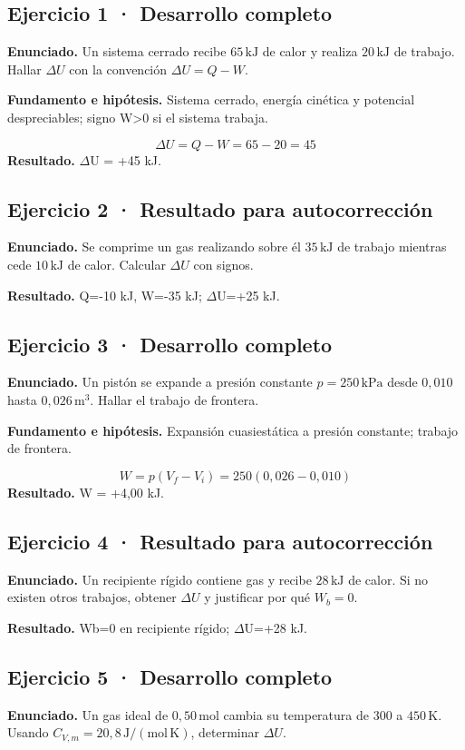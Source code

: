 \documentclass[11pt,a4paper]{article}
\begin{document}
\subsection*{Ejercicio 1 · Desarrollo completo}
\textbf{Enunciado.} Un sistema cerrado recibe \(65\,\mathrm{kJ}\) de calor y realiza \(20\,\mathrm{kJ}\) de trabajo. Hallar \(\Delta U\) con la convención \(\Delta U=Q-W\).

\textbf{Fundamento e hipótesis.} Sistema cerrado, energía cinética y potencial despreciables; signo W>0 si el sistema trabaja.

\[
\Delta U=Q-W=65-20=45
\]
\textbf{Resultado.} \ensuremath{\Delta}U = +45 kJ.


\subsection*{Ejercicio 2 · Resultado para autocorrección}
\textbf{Enunciado.} Se comprime un gas realizando sobre él \(35\,\mathrm{kJ}\) de trabajo mientras cede \(10\,\mathrm{kJ}\) de calor. Calcular \(\Delta U\) con signos.

\textbf{Resultado.} Q=-10 kJ, W=-35 kJ; \ensuremath{\Delta}U=+25 kJ.


\subsection*{Ejercicio 3 · Desarrollo completo}
\textbf{Enunciado.} Un pistón se expande a presión constante \(p=250\,\mathrm{kPa}\) desde \(0{,}010\) hasta \(0{,}026\,\mathrm{m^3}\). Hallar el trabajo de frontera.

\textbf{Fundamento e hipótesis.} Expansión cuasiestática a presión constante; trabajo de frontera.

\[
W=p(V_f-V_i)=250(0{,}026-0{,}010)
\]
\textbf{Resultado.} W = +4,00 kJ.


\subsection*{Ejercicio 4 · Resultado para autocorrección}
\textbf{Enunciado.} Un recipiente rígido contiene gas y recibe \(28\,\mathrm{kJ}\) de calor. Si no existen otros trabajos, obtener \(\Delta U\) y justificar por qué \(W_b=0\).

\textbf{Resultado.} Wb=0 en recipiente rígido; \ensuremath{\Delta}U=+28 kJ.


\subsection*{Ejercicio 5 · Desarrollo completo}
\textbf{Enunciado.} Un gas ideal de \(0{,}50\,\mathrm{mol}\) cambia su temperatura de \(300\) a \(450\,\mathrm K\). Usando \(C_{V,m}=20{,}8\,\mathrm{J/(mol\,K)}\), determinar \(\Delta U\).
\end{document}
